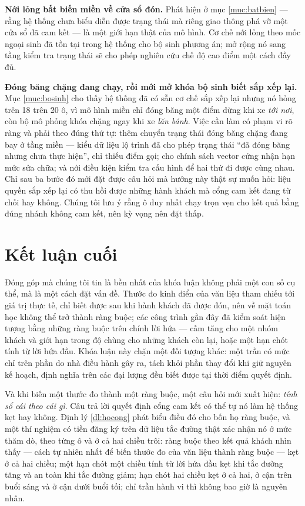 \textbf{Nới lỏng bất biến miền về cửa sổ đón.} Phát hiện ở mục \ref{muc:batbien} --- rằng hệ thống chưa biểu
diễn được trạng thái mà riêng giao thông phá vỡ một cửa sổ đã cam kết --- là một giới hạn thật
của mô hình. Cơ chế nới lỏng theo mốc ngoại sinh đã tồn tại trong hệ thống cho bộ sinh phương án;
mở rộng nó sang tầng kiểm tra trạng thái sẽ cho phép nghiên cứu chế độ cao điểm một cách đầy đủ.

\textbf{Đóng băng chặng đang chạy, rồi mới mở khóa bộ sinh biết sắp xếp lại.} Mục
\ref{muc:bosinh} cho thấy hệ thống đã có sẵn cơ chế sắp xếp lại nhưng nó hỏng trên 18 trên 20
ô, vì mô hình miền chỉ đóng băng một điểm dừng khi xe \emph{tới nơi}, còn bộ mô phỏng khóa chặng
ngay khi xe \emph{lăn bánh}. Việc cần làm có phạm vi rõ ràng và phải theo đúng thứ tự: thêm
chuyển trạng thái đóng băng chặng đang bay ở tầng miền --- kiểu dữ liệu lộ trình đã cho phép
trạng thái ``đã đóng băng nhưng chưa thực hiện'', chỉ thiếu điểm gọi; cho chính sách vector cứng
nhận hạn mức sửa chữa; và nới điều kiện kiểm tra cấu hình để hai thứ đi được cùng nhau. Chỉ sau
ba bước đó mới đặt được câu hỏi mà hướng này thật sự muốn hỏi: liệu quyền sắp xếp lại có thu hồi
được những hành khách mà cổng cam kết đang từ chối hay không. Chúng tôi lưu ý rằng ô duy nhất
chạy trọn vẹn cho kết quả bằng đúng nhánh không cam kết, nên kỳ vọng nên đặt thấp.

\section{Kết luận cuối}

Đóng góp mà chúng tôi tin là bền nhất của khóa luận không phải một con số cụ thể, mà là một cách
đặt vấn đề. Thước đo kinh điển của văn liệu tham chiếu tới giá trị thực tế, chỉ biết được sau khi
hành khách đã được đón, nên về mặt toán học không thể trở thành ràng buộc; các công trình gần đây
đã kiểm soát hiện tượng bằng những ràng buộc trên chính lời hứa --- cấm tăng cho một nhóm khách và
giới hạn trong độ chùng cho những khách còn lại, hoặc một hạn chót tính từ lời hứa đầu. Khóa luận
này chặn một đối tượng khác: một trần có mức chỉ trên phần do nhà điều hành gây ra, tách khỏi phần
thay đổi khi giữ nguyên kế hoạch, định nghĩa trên các đại lượng đều biết được tại thời điểm quyết
định.

Và khi biến một thước đo thành một ràng buộc, một câu hỏi mới xuất hiện: \emph{tính sổ cái theo
cái gì}. Câu trả lời quyết định cổng cam kết có thể tự nó làm hệ thống kẹt hay không. Định lý
\ref{dl:hocong} phát biểu điều đó cho bốn họ ràng buộc, và một thí nghiệm có tiền đăng ký trên dữ
liệu tắc đường thật xác nhận nó ở mức thăm dò, theo từng ô và ở cả hai chiều trôi: ràng buộc theo kết
quả khách nhìn thấy --- cách tự nhiên nhất để biến thước đo của văn liệu thành ràng buộc --- kẹt ở
cả hai chiều; một hạn chót một chiều tính từ lời hứa đầu kẹt khi tắc đường tăng và an toàn khi tắc
đường giảm; hạn chót hai chiều kẹt ở cả hai, ở cận trên buổi sáng và ở cận dưới buổi tối; chỉ trần
hành vi thì không bao giờ là nguyên nhân.
